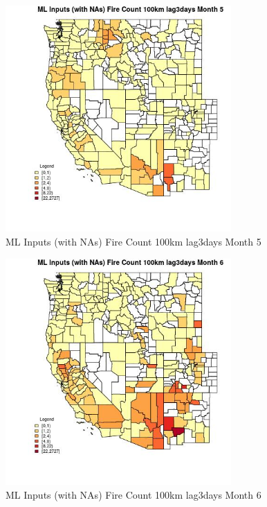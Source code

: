 \begin{figure} 
\centering  
\includegraphics[width=0.77\textwidth]{Code_Outputs/Report_ML_input_PM25_Step4_part_f_de_duplicated_aveswNAs_CountyFire_Count_100km_lag3daysmedianMonth5.jpg} 
\caption{\label{fig:Report_ML_input_PM25_Step4_part_f_de_duplicated_aveswNAsCountyFire_Count_100km_lag3daysmedianMonth5}ML Inputs (with NAs) Fire Count 100km lag3days Month 5} 
\end{figure} 
 

\begin{figure} 
\centering  
\includegraphics[width=0.77\textwidth]{Code_Outputs/Report_ML_input_PM25_Step4_part_f_de_duplicated_aveswNAs_CountyFire_Count_100km_lag3daysmedianMonth6.jpg} 
\caption{\label{fig:Report_ML_input_PM25_Step4_part_f_de_duplicated_aveswNAsCountyFire_Count_100km_lag3daysmedianMonth6}ML Inputs (with NAs) Fire Count 100km lag3days Month 6} 
\end{figure} 
 

